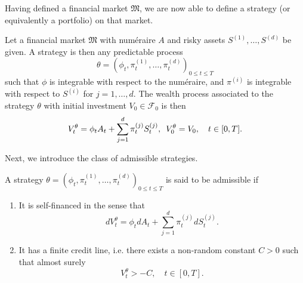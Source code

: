 Having defined a financial market $\mathfrak{M}$, we are now able to define a strategy (or equivalently a portfolio) on that market.
\begin{defn}
    Let a financial market $\mathfrak{M}$ with numéraire $A$ and risky assets $S^{(1)},\dots,S^{(d)}$ be given. A strategy is then any predictable process
    \begin{equation}
        \theta=(\phi_{t},\pi_{t}^{(1)},\dots,\pi_{t}^{(d)})_{0\leq t\leq T}
    \end{equation}
    such that $\phi$ is integrable with respect to the numéraire, and $\pi^{(i)}$ is integrable with respect to $S^{(i)}$ for $j=1,\dots,d$.
    The wealth process associated to the strategy $\theta$ with initial investment $V_{0}\in \mathcal{F}_{0}$ is then
    \begin{equation}
        V_{t}^{\theta}=\phi_{t}A_{t}+\sum_{j=1}^{d}\pi_{t}^{(j)}S_{t}^{(j)},\hspace{5 pt} V_{0}^{\theta}=V_{0}, \quad t\in [0,T].
    \end{equation}
\end{defn}
Next, we introduce the class of admissible strategies.
\begin{defn}
    A strategy $\theta=(\phi_{t},\pi_{t}^{(1)},\dots,\pi_{t}^{(d)})_{0\leq t\leq T}$ is said to be admissible if
    \begin{enumerate}
        \item It is self-financed in the sense that
        \begin{equation}
            dV_{t}^{\theta}=\phi_{t}dA_{t}+\sum_{j=1}^{d}\pi_{t}^{(j)}dS_{t}^{(j)}.
        \end{equation}
        \item It has a finite credit line, i.e. there exists a non-random constant $C>0$ such that almost surely
        \begin{equation}
            V_{t}^{\theta}>-C, \quad t\in [0,T].
        \end{equation}
    \end{enumerate}
\end{defn}
